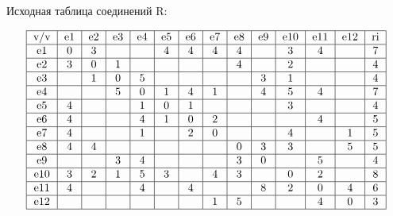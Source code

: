 \documentclass{article}
\begin{document}
\itmo[
  variant=161,
  labn=1,
  worktype=Домашняя работа,
  discipline=Дискретная математика,
  group=P3115,
  student=Владимир Мацюк,
  teacher=Поляков Владимир Иванович,
  logo=../../../lib/img/itmo.png
]

Исходная таблица соединений R:

$$\begin{tabular}{|c|c|c|c|c|c|c|c|c|c|c|c|c|c|c|c|c|c|c|c|c|c|c|c|} \hline
    v/v & e1 & e2 & e3 & e4 & e5 & e6 & e7 & e8 & e9 & e10 & e11 & e12 & ri  \nl
    e1  & 0  & 3  &    &    & 4  & 4  & 4  & 4  &    & 3   & 4   &     & 7  \nl
    e2  & 3  & 0  & 1  &    &    &    &    & 4  &    & 2   &     &     & 4  \nl
    e3  &    & 1  & 0  & 5  &    &    &    &    & 3  & 1   &     &     & 4  \nl
    e4  &    &    & 5  & 0  & 1  & 4  & 1  &    & 4  & 5   & 4   &     & 7  \nl
    e5  & 4  &    &    & 1  & 0  & 1  &    &    &    & 3   &     &     & 4  \nl
    e6  & 4  &    &    & 4  & 1  & 0  & 2  &    &    &     & 4   &     & 5  \nl
    e7  & 4  &    &    & 1  &    & 2  & 0  &    &    & 4   &     & 1   & 5  \nl
    e8  & 4  & 4  &    &    &    &    &    & 0  & 3  & 3   &     & 5   & 5  \nl
    e9  &    &    & 3  & 4  &    &    &    & 3  & 0  &     & 5   &     & 4  \nl
    e10 & 3  & 2  & 1  & 5  & 3  &    & 4  & 3  &    & 0   & 2   &     & 8  \nl
    e11 & 4  &    &    & 4  &    & 4  &    &    & 8  & 2   & 0   & 4   & 6  \nl
    e12 &    &    &    &    &    &    & 1  & 5  &    &     & 4   & 0   & 3  \nl
  \end{tabular}$$
\end{document}
